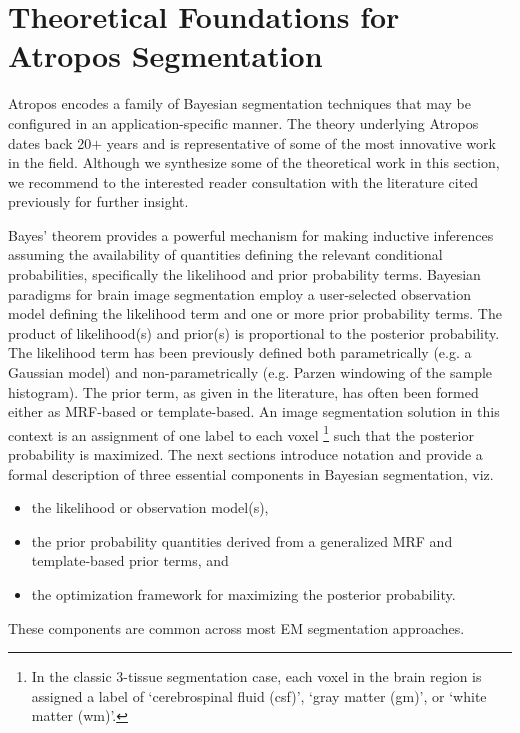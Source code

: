 \documentclass[11pt,english]{article}
\begin{document}


\section{Theoretical Foundations for Atropos Segmentation} 

Atropos encodes a family of Bayesian segmentation techniques that may be configured in an application-specific manner.  The theory underlying Atropos dates back 20$+$ years and is representative of some of the most innovative work in the field.  Although we synthesize some of the theoretical work in this section, we recommend to the interested reader consultation with the literature cited previously for further insight.

Bayes' theorem provides a powerful mechanism for making inductive
inferences assuming the availability of quantities defining the
relevant conditional probabilities, specifically the likelihood and
prior probability terms.  Bayesian paradigms for brain image
segmentation employ a user-selected observation model defining the
likelihood term and one or more prior probability terms.  The product
of likelihood(s) and prior(s) is proportional to the posterior
probability.  The likelihood term has been previously defined both 
parametrically (e.g. a Gaussian model) and non-parametrically
(e.g. Parzen windowing of the sample histogram).  The prior term, as
given in the literature, has often been formed either as
MRF-based or template-based.  An image segmentation solution in this
context is an assignment of one label to each voxel
\footnote{
In the classic 3-tissue segmentation case, each voxel in the brain region is assigned a label of `cerebrospinal fluid (csf)', `gray matter (gm)', or `white matter (wm)'. 
}
such that the posterior probability is maximized.  The next sections
introduce notation and provide a formal description of three essential
components in Bayesian segmentation, viz.
\begin{itemize}
  \item the likelihood or observation model(s),
  \item the prior probability quantities derived from a generalized
    MRF and template-based prior terms, and 
  \item the optimization framework for maximizing the posterior probability.
\end{itemize}
These components are common across most EM segmentation approaches. 
\end{document}
